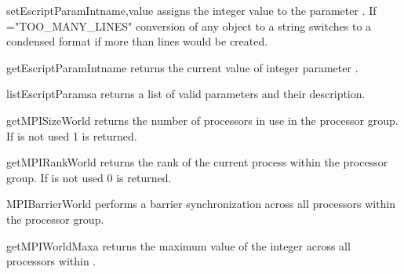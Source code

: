 \begin{funcdesc}{setEscriptParamInt}{name,value}
assigns the integer value  to the parameter .
If ="TOO_MANY_LINES" conversion of any \Data object to a string
switches to a condensed format if more than  lines would be created.
\end{funcdesc}

\begin{funcdesc}{getEscriptParamInt}{name}
returns the current value of integer parameter .
\end{funcdesc}

\begin{funcdesc}{listEscriptParams}{a}
returns a list of valid parameters and their description.
\end{funcdesc}

\begin{funcdesc}{getMPISizeWorld}{}
returns the number of \MPI processors in use in the  processor group.
If \MPI is not used 1 is returned.
\end{funcdesc}

\begin{funcdesc}{getMPIRankWorld}{}
returns the rank of the current process within the 
processor group. If \MPI is not used 0 is returned.
\end{funcdesc}

\begin{funcdesc}{MPIBarrierWorld}{}
performs a barrier synchronization across all processors within the
 processor group.
\end{funcdesc}

\begin{funcdesc}{getMPIWorldMax}{a}
returns the maximum value of the integer  across all processors within
.
\end{funcdesc}

